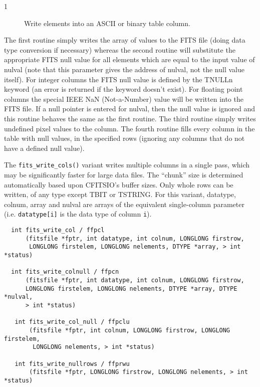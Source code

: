 \documentclass[11pt]{book}
\begin{document}
\begin{description}
\item[1 ] Write elements into an ASCII or binary table column.
\end{description}
   The first routine simply writes the array of values to the FITS file
   (doing data type conversion if necessary) whereas the second routine
   will substitute the  appropriate FITS null value for all elements
   which are equal to the input value of nulval (note that this
   parameter gives the address of nulval, not the null value
   itself).  For integer columns the FITS null value is defined by the
   TNULLn keyword (an error is returned if the keyword doesn't exist).
   For floating point columns  the special IEEE NaN (Not-a-Number)
   value will be written into the FITS file.  If a null pointer is
   entered for nulval, then the null value is ignored and this routine
   behaves the same as the first routine.  The third routine
   simply writes undefined pixel values to the column.  The fourth routine
   fills every column in the table with null values, in the specified
   rows (ignoring any columns that do not have a defined null value).

   The \verb+fits_write_cols()+ variant writes multiple columns in a
   single pass, which may be significantly faster for large data
   files.  The ``chunk'' size is determined automatically based upon
   CFITSIO's buffer sizes.  Only whole rows can be written, of any
   type except TBIT or TSTRING.  For this variant, datatype, colnum,
   array and nulval are arrays of the equivalent single-column
   parameter (i.e. \verb+datatype[i]+ is the data type of column
   \verb+i+). 

   \label{ffpcl} \label{ffpcn} \label{ffpclu} \label{ffpcln}

\begin{verbatim}
  int fits_write_col / ffpcl
      (fitsfile *fptr, int datatype, int colnum, LONGLONG firstrow,
       LONGLONG firstelem, LONGLONG nelements, DTYPE *array, > int *status)

  int fits_write_colnull / ffpcn
      (fitsfile *fptr, int datatype, int colnum, LONGLONG firstrow,
      LONGLONG firstelem, LONGLONG nelements, DTYPE *array, DTYPE *nulval,
      > int *status)

   int fits_write_col_null / ffpclu
       (fitsfile *fptr, int colnum, LONGLONG firstrow, LONGLONG firstelem,
        LONGLONG nelements, > int *status)

   int fits_write_nullrows / ffprwu
       (fitsfile *fptr, LONGLONG firstrow, LONGLONG nelements, > int *status)
\end{verbatim}
\end{document}
